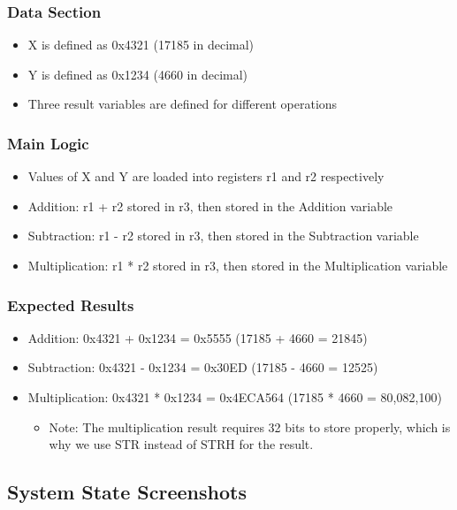 \documentclass[12pt,a4paper]{article}
\begin{document}
\subsubsection{Data Section}
\begin{itemize}
    \item X is defined as 0x4321 (17185 in decimal)
    \item Y is defined as 0x1234 (4660 in decimal)
    \item Three result variables are defined for different operations
\end{itemize}

\subsubsection{Main Logic}
\begin{itemize}
    \item Values of X and Y are loaded into registers r1 and r2 respectively
    \item Addition: r1 + r2 stored in r3, then stored in the Addition variable
    \item Subtraction: r1 - r2 stored in r3, then stored in the Subtraction variable
    \item Multiplication: r1 * r2 stored in r3, then stored in the Multiplication variable
\end{itemize}

\subsubsection{Expected Results}
\begin{itemize}
    \item Addition: 0x4321 + 0x1234 = 0x5555 (17185 + 4660 = 21845)
    \item Subtraction: 0x4321 - 0x1234 = 0x30ED (17185 - 4660 = 12525)
    \item Multiplication: 0x4321 * 0x1234 = 0x4ECA564 (17185 * 4660 = 80,082,100)
        \begin{itemize}
            \item Note: The multiplication result requires 32 bits to store properly, which is why we use STR instead of STRH for the result.
        \end{itemize}
\end{itemize}

\subsection{System State Screenshots}
\end{document}
